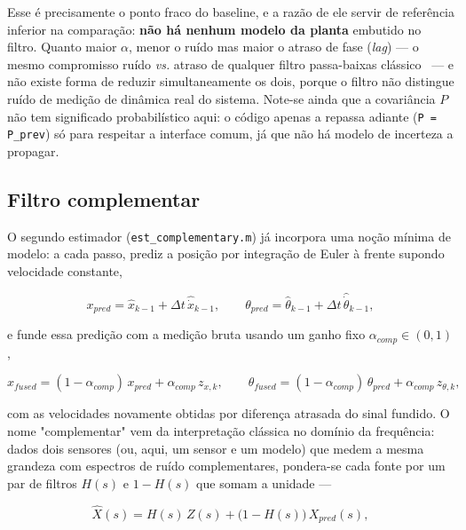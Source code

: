 \documentclass[brazil, 12pt]{article}
\begin{document}
Esse é precisamente o ponto fraco do baseline, e a razão de ele servir de
referência inferior na comparação: \textbf{não há nenhum modelo da planta}
embutido no filtro. Quanto maior $\alpha$, menor o ruído mas maior o atraso de
fase (\emph{lag}) — o mesmo compromisso ruído \emph{vs.} atraso de qualquer
filtro passa-baixas clássico~\cite{oppenheim} — e não existe forma de reduzir
simultaneamente os dois, porque o filtro não distingue ruído de medição de
dinâmica real do sistema. Note-se ainda que a covariância $P$ não tem
significado probabilístico aqui: o código apenas a repassa adiante
(\texttt{P = P\_prev}) só para respeitar a interface comum, já que não há
modelo de incerteza a propagar.

\subsection{Filtro complementar}
\label{sec:complementar}

O segundo estimador (\texttt{est\_complementary.m}) já incorpora uma noção
mínima de modelo: a cada passo, prediz a posição por integração de Euler à
frente supondo velocidade constante,

\[
x_{pred} = \hat x_{k-1} + \Delta t\,\hat{\dot x}_{k-1},
\qquad
\theta_{pred} = \hat\theta_{k-1} + \Delta t\,\hat{\dot\theta}_{k-1},
\]

e funde essa predição com a medição bruta usando um ganho fixo
$\alpha_{comp}\in(0,1)$,

\[
x_{fused} = (1-\alpha_{comp})\,x_{pred} + \alpha_{comp}\,z_{x,k},
\qquad
\theta_{fused} = (1-\alpha_{comp})\,\theta_{pred} + \alpha_{comp}\,z_{\theta,k},
\]

com as velocidades novamente obtidas por diferença atrasada do sinal fundido.
O nome "complementar" vem da interpretação clássica no domínio da frequência:
dados dois sensores (ou, aqui, um
sensor e um modelo) que medem a mesma grandeza com espectros de ruído
complementares, pondera-se cada fonte por um par de filtros $H(s)$ e $1-H(s)$
que somam a unidade —

\[
\hat X(s) = H(s)\,Z(s) + \big(1-H(s)\big)\,X_{pred}(s),
\]
\end{document}
